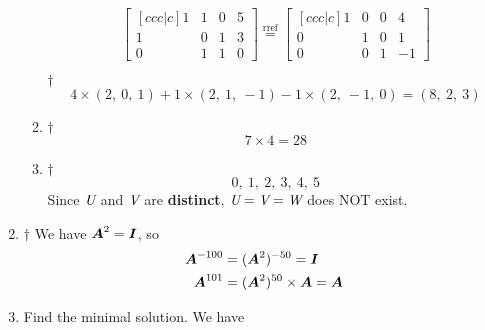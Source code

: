 \documentclass[a4paper,12pt]{article}
\begin{document}
\begin{enumerate}
\begin{enumerate}[label=(\alph*)]
\begin{equation}
            \begin{bmatrix}[ccc|c]
                1 & 1 & 0 & 5 \\
                1 & 0 & 1 & 3 \\
                0 & 1 & 1 & 0
            \end{bmatrix} \overset{\text{rref}}= \begin{bmatrix}[ccc|c]
                1 & 0 & 0 & 4 \\
                0 & 1 & 0 & 1 \\
                0 & 0 & 1 & -1
            \end{bmatrix}
        \end{equation}
        \begin{answer}{$\dag$}\begin{equation}
                4 \times (2, \ 0, \ 1) + 1 \times (2, \ 1, \ -1) - 1 \times (2, \ -1, \ 0) = (8, \ 2, \ 3)
            \end{equation}
        \end{answer}
        \item \begin{answer}{$\dag$}\begin{equation}
                7 \times 4 = 28
            \end{equation}
        \end{answer}
        \item \begin{answer}{$\dag$}\begin{equation}
                0, \ 1, \ 2, \ 3, \ 4, \ 5
            \end{equation} Since $\textit{U}$ and $\textit{V}$ are \textbf{distinct}, $\textit{U} = \textit{V} = \textit{W}$ does NOT exist.
        \end{answer}
    \end{enumerate}
    \item \begin{answer}{$\dag$} We have $\boldsymbol{A}^2 = \boldsymbol{I}$, so \begin{equation}
            \begin{aligned}
                \boldsymbol{A}^{-100} & = (\boldsymbol{A}^2)^{-50} = \boldsymbol{I} \\
                \boldsymbol{A}^{101} & = (\boldsymbol{A}^2)^{50} \times \boldsymbol{A} = \boldsymbol{A}
            \end{aligned}
        \end{equation}
    \end{answer}
    \item Find the minimal solution. We have \begin{equation}

\end{equation}
\end{enumerate}
\end{document}
